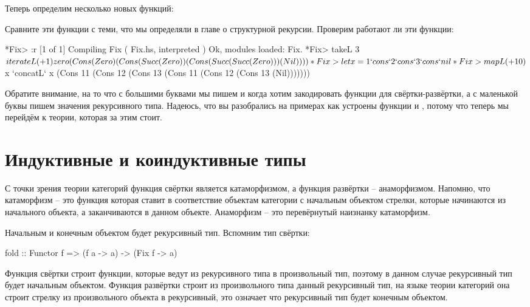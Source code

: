 Теперь определим несколько новых функций:


Сравните эти функции с теми, что мы определяли в главе 
о структурной рекурсии. Проверим работают ли эти функции:

\begin{code}
*Fix> :r
[1 of 1] Compiling Fix              ( Fix.hs, interpreted )
Ok, modules loaded: Fix.
*Fix> takeL 3 $ iterateL (+1) zero
(Cons (Zero) (Cons (Succ (Zero)) (Cons (Succ (Succ (Zero))) (Nil))))
*Fix> let x = 1 `cons` 2 `cons` 3 `cons` nil
*Fix> mapL (+10) $ x `concatL` x
(Cons 11 (Cons 12 (Cons 13 (Cons 11 (Cons 12 (Cons 13 (Nil)))))))
\end{code}

Обратите внимание, на то что с большими буквами мы пишем
 и  когда хотим закодировать функции 
для свёртки-развёртки, а с маленькой буквы пишем значения
рекурсивного типа. Надеюсь, что вы разобрались на примерах
как устроены функции  и , потому что
теперь мы перейдём к теории, которая за этим стоит.

\section{Индуктивные и коиндуктивные типы}

С точки зрения теории категорий функция свёртки
является катаморфизмом, а функция развёртки -- анаморфизмом.
Напомню, что катаморфизм -- это функция которая ставит
в соответствие объектам категории с начальным объектом
стрелки, которые начинаются из начального объекта, а 
заканчиваются в данном объекте. Анаморфизм -- это
перевёрнутый наизнанку катаморфизм.

Начальным и конечным объектом будет рекурсивный тип.
Вспомним тип свёртки:

\begin{code}
fold :: Functor f => (f a -> a) -> (Fix f -> a)
\end{code}

Функция свёртки строит функции, которые ведут из рекурсивного
типа в произвольный тип, поэтому в данном случае рекурсивный тип будет
начальным объектом. Функция развёртки строит из произвольного типа
данный рекурсивный тип, на языке теории категорий
она строит стрелку из произвольного объекта в рекурсивный,
это означает что  рекурсивный тип будет конечным объектом.

